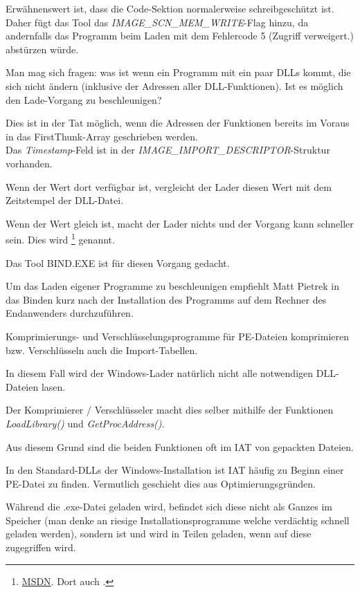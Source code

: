 Erwähnenswert ist, dass die Code-Sektion normalerweise schreibgeschützt ist.
Daher fügt das Tool das \emph{IMAGE\_SCN\_MEM\_WRITE}-Flag hinzu, da andernfalls
das Programm beim Laden mit dem Fehlercode 5 (Zugriff verweigert.) abstürzen
würde.

Man mag sich fragen: was ist wenn ein Programm mit ein paar DLLs kommt, die
sich nicht ändern (inklusive der Adressen aller DLL-Funktionen). Ist es möglich
den Lade-Vorgang zu beschleunigen?

Dies ist in der Tat möglich, wenn die Adressen der Funktionen bereits im Voraus
in das FirstThunk-Array geschrieben werden. \\
Das \emph{Timestamp}-Feld ist in der \emph{IMAGE\_IMPORT\_DESCRIPTOR}-Struktur vorhanden.

Wenn der Wert dort verfügbar ist, vergleicht der Lader diesen Wert mit dem
Zeitstempel der DLL-Datei.

Wenn der Wert gleich ist, macht der Lader nichts und der Vorgang kann schneller
sein. Dies wird \footnote{\href{http://blogs.msdn.com/b/oldnewthing/archive/2010/03/18/9980802.aspx}{MSDN}. Dort auch .}
genannt.

Das Tool BIND.EXE ist für diesen Vorgang gedacht.

Um das Laden eigener Programme zu beschleunigen empfiehlt Matt Pietrek in \PietrekPEURL
das Binden kurz nach der Installation des Programms auf dem Rechner des Endanwenders
durchzuführen.

Komprimierungs- und Verschlüsselungsprogramme für PE-Dateien komprimieren bzw.
Verschlüsseln auch die Import-Tabellen.

In diesem Fall wird der Windows-Lader natürlich nicht alle notwendigen DLL-Dateien lasen.

Der Komprimierer / Verschlüsseler macht dies selber mithilfe der Funktionen
\emph{LoadLibrary()} und \emph{GetProcAddress()}.

Aus diesem Grund sind die beiden Funktionen oft im \ac{IAT} von gepackten Dateien.

In den Standard-DLLs der Windows-Installation ist \ac{IAT} häufig zu Beginn einer
PE-Datei zu finden. Vermutlich geschieht dies aus Optimierungsgründen.

Während die .exe-Datei geladen wird, befindet sich diese nicht als Ganzes im Speicher
(man denke an riesige Installationsprogramme welche verdächtig schnell geladen werden),
sondern ist  und wird in Teilen geladen, wenn auf diese zugegriffen wird.

